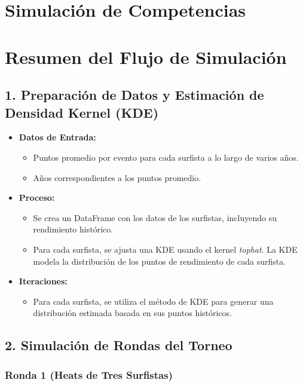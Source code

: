 \documentclass[12pt]{article}
\begin{document}
\section*{Simulación de Competencias}

\section*{Resumen del Flujo de Simulación}

\subsection*{1. Preparación de Datos y Estimación de Densidad Kernel (KDE)}

\begin{itemize}
    \item \textbf{Datos de Entrada:}
        \begin{itemize}
            \item Puntos promedio por evento para cada surfista a lo largo de varios años.
            \item Años correspondientes a los puntos promedio.
        \end{itemize}
    \item \textbf{Proceso:}
        \begin{itemize}
            \item Se crea un DataFrame con los datos de los surfistas, incluyendo su rendimiento histórico.
            \item Para cada surfista, se ajusta una KDE usando el kernel \textit{tophat}. La KDE modela la distribución de los puntos de rendimiento de cada surfista.
        \end{itemize}
    \item \textbf{Iteraciones:}
        \begin{itemize}
            \item Para cada surfista, se utiliza el método de KDE para generar una distribución estimada basada en sus puntos históricos.
        \end{itemize}
\end{itemize}

\subsection*{2. Simulación de Rondas del Torneo}

\subsubsection*{Ronda 1 (Heats de Tres Surfistas)}
\end{document}
